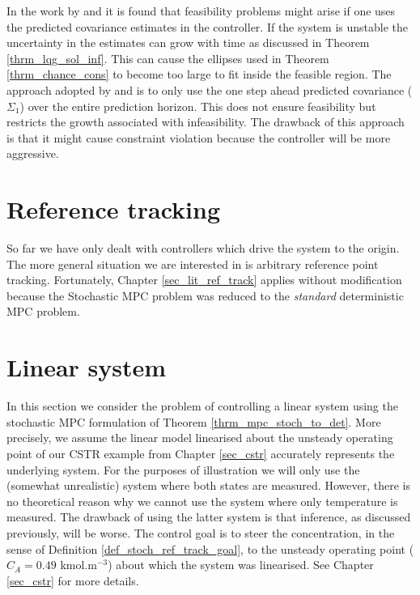 In the work by \cite{yan1} and \cite{yan2} it is found that feasibility problems might arise if one uses the predicted covariance estimates in the controller. If the system is unstable the uncertainty in the estimates can grow with time as discussed in Theorem \ref{thrm_lqg_sol_inf}. This can cause the ellipses used in Theorem \ref{thrm_chance_cons} to become too large to fit inside the feasible region. The approach adopted by \cite{yan1} and \cite{yan2} is to only use the one step ahead predicted covariance ($\Sigma_1$) over the entire prediction horizon. This does not ensure feasibility but restricts the growth associated with infeasibility. The drawback of this approach is that it might cause constraint violation because the controller will be more aggressive.  

\section{Reference tracking}
So far we have only dealt with controllers which drive the system to the origin. The more general situation we are interested in is arbitrary reference point tracking. Fortunately, Chapter \ref{sec_lit_ref_track} applies without modification because the Stochastic MPC problem was reduced to the \textit{standard} deterministic MPC problem. 

\section{Linear system}
\label{sec_lin_sys_cont}
In this section we consider the problem of controlling a linear system using the stochastic MPC formulation of Theorem \ref{thrm_mpc_stoch_to_det}. More precisely, we assume the linear model linearised about the unsteady operating point of our CSTR example from Chapter \ref{sec_cstr} accurately represents the underlying system. For the purposes of illustration we will only use the (somewhat unrealistic) system where both states are measured. However, there is no theoretical reason why we cannot use the system where only temperature is measured. The drawback of using the latter system is that inference, as discussed previously, will be worse. The control goal is to steer the concentration, in the sense of Definition \ref{def_stoch_ref_track_goal}, to the unsteady operating point ($C_A = 0.49$ kmol.m$^{-3}$) about which the system was linearised. See Chapter \ref{sec_cstr} for more details.

